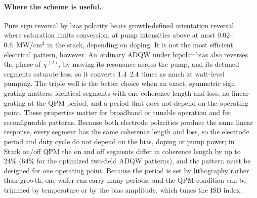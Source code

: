 \documentclass[11pt]{article}
\newcommand{\chitwo}{\chi^{(2)}}
\begin{document}
\paragraph{Where the scheme is useful.} Pure sign reversal by bias polarity beats growth-defined orientation reversal where saturation limits conversion, at pump intensities above at most 0.02--0.6~MW/cm$^2$ in the stack, depending on doping. It is not the most efficient electrical pattern, however. An ordinary ADQW under bipolar bias also reverses the phase of $\chitwo$, by moving its resonance across the pump, and its detuned segments saturate less, so it converts 1.4--2.4 times as much at watt-level pumping. The triple well is the better choice when an exact, symmetric sign grating matters: identical segments with one coherence length and loss, no linear grating at the QPM period, and a period that does not depend on the operating point. These properties matter for broadband or tunable operation and for reconfigurable patterns. Because both electrode polarities produce the same linear response, every segment has the same coherence length and loss, so the electrode period and duty cycle do not depend on the bias, doping or pump power; in Stark on/off QPM the on and off segments differ in coherence length by up to 24\% (64\% for the optimized two-field ADQW patterns), and the pattern must be designed for one operating point. Because the period is set by lithography rather than growth, one wafer can carry many periods, and the QPM condition can be trimmed by temperature or by the bias amplitude, which tunes the ISB index.
\end{document}
